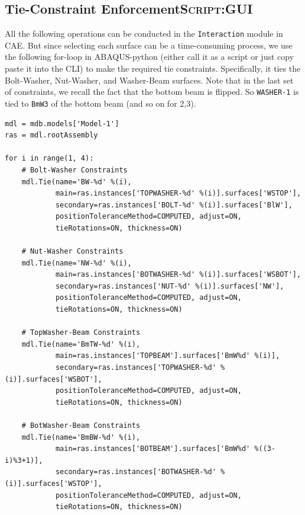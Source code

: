 \documentclass[11pt]{article}
\begin{document}
\subsection{Tie-Constraint Enforcement\hfill{}\textsc{Script:GUI}}
\label{sec:orgbaaf771}
All the following operations can be conducted in the \texttt{Interaction} module in CAE.
But since selecting each surface can be a time-consuming process, we use the following for-loop in ABAQUS-python (either call it as a script or just copy paste it into the CLI) to make the required tie constraints.
Specifically, it ties the Bolt-Washer, Nut-Washer, and Washer-Beam surfaces.
Note that in the last set of constraints, we recall the fact that the bottom beam is flipped.
So \texttt{WASHER-1} is tied to \texttt{BmW3} of the bottom beam (and so on for 2,3).
\begin{verbatim}
mdl = mdb.models['Model-1']
ras = mdl.rootAssembly

for i in range(1, 4):
    # Bolt-Washer Constraints
    mdl.Tie(name='BW-%d' %(i),
            main=ras.instances['TOPWASHER-%d' %(i)].surfaces['WSTOP'],
            secondary=ras.instances['BOLT-%d' %(i)].surfaces['BlW'],
            positionToleranceMethod=COMPUTED, adjust=ON,
            tieRotations=ON, thickness=ON)

    # Nut-Washer Constraints
    mdl.Tie(name='NW-%d' %(i),
            main=ras.instances['BOTWASHER-%d' %(i)].surfaces['WSBOT'],
            secondary=ras.instances['NUT-%d' %(i)].surfaces['NW'],
            positionToleranceMethod=COMPUTED, adjust=ON,
            tieRotations=ON, thickness=ON)

    # TopWasher-Beam Constraints
    mdl.Tie(name='BmTW-%d' %(i),
            main=ras.instances['TOPBEAM'].surfaces['BmW%d' %(i)],
            secondary=ras.instances['TOPWASHER-%d' %(i)].surfaces['WSBOT'],
            positionToleranceMethod=COMPUTED, adjust=ON,
            tieRotations=ON, thickness=ON)

    # BotWasher-Beam Constraints
    mdl.Tie(name='BmBW-%d' %(i),
            main=ras.instances['BOTBEAM'].surfaces['BmW%d' %((3-i)%3+1)],
            secondary=ras.instances['BOTWASHER-%d' %(i)].surfaces['WSTOP'],
            positionToleranceMethod=COMPUTED, adjust=ON,
            tieRotations=ON, thickness=ON)
\end{verbatim}
\end{document}
